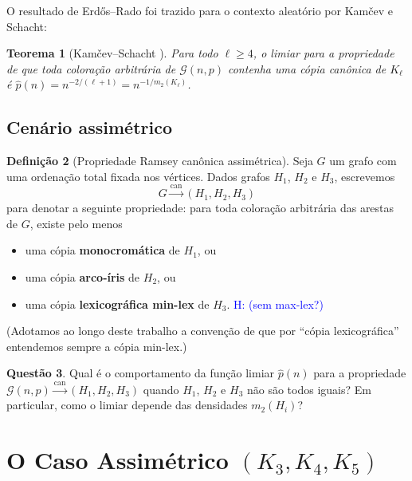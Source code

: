 \documentclass[reqno, 12pt]{amsart}
\numberwithin{equation}{section}
\theoremstyle{plain}
\newtheorem{theorem}{Teorema}[section]
\theoremstyle{definition}
\newtheorem{definition}[theorem]{Definição}
\newtheorem{question}[theorem]{Questão}
\newcommand{\Gnp}{\mathcal{G}(n,p)}
\newcommand{\mdens}{m_2}
\newcommand{\hugo}[1]{\textcolor{blue}{H: #1}}
\begin{document}
O resultado de Erdős--Rado foi trazido para o contexto aleatório por Kamčev e Schacht:

\begin{theorem}[Kamčev--Schacht \cite{kamcev2023canonical}]
    \label{thm:kamcev}
    Para todo $\ell \ge 4$, o limiar para a propriedade de que toda coloração
    arbitrária de $\Gnp$ contenha uma cópia canônica de $K_\ell$ é
    $\hat{p}(n) = n^{-2/(\ell+1)} = n^{-1/\mdens(K_\ell)}$.
\end{theorem}

\subsection{Cenário assimétrico}

\begin{definition}[Propriedade Ramsey canônica assimétrica]
    \label{def:assimetrico}
    Seja $G$ um grafo com uma ordenação total fixada nos vértices.
    Dados grafos $H_1$, $H_2$ e $H_3$, escrevemos
    \[
        G \xrightarrow{\mathrm{can}} (H_1, H_2, H_3)
    \]
    para denotar a seguinte propriedade: para toda coloração arbitrária das
    arestas de $G$, existe pelo menos
    \begin{itemize}
        \item uma cópia \textbf{monocromática} de $H_1$, ou
        \item uma cópia \textbf{arco-íris} de $H_2$, ou
        \item uma cópia \textbf{lexicográfica min-lex} de $H_3$. \hugo{(sem max-lex?)}
    \end{itemize}
    (Adotamos ao longo deste trabalho a convenção de que por ``cópia lexicográfica'' entendemos sempre a cópia min-lex.)
\end{definition}

\begin{question}
    \label{q:assimetrico}
    Qual é o comportamento da função limiar $\hat{p}(n)$ para a propriedade
    $\Gnp \xrightarrow{\mathrm{can}} (H_1, H_2, H_3)$
    quando $H_1$, $H_2$ e $H_3$ não são todos iguais?
    Em particular, como o limiar depende das densidades $\mdens(H_i)$?
\end{question}

\section{O Caso Assimétrico \texorpdfstring{$(K_3, K_4, K_5)$}{(K3, K4, K5)}}
\end{document}

